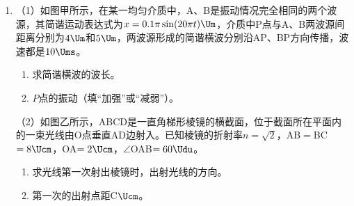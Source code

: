 \documentclass[\gkver]{gaokaozhenti}
\begin{document}
\begin{enumerate}
{根据理想气体状态方程得$\frac{p_{0}V_{0}}{T_{0}}=\frac{pV}{T}$②，

代入数据得$V=2.8\times10^{-2}\Umc$③。
}

\item
（1）如图甲所示，在某一均匀介质中，A、B是振动情况完全相同的两个波源，其简谐运动表达式为$x=0.1\pi\sin(20\pi t)\Um$，介质中P点与A、B两波源间距离分别为$4\Um$和$5\Um$，两波源形成的简谐横波分别沿AP、BP方向传播，波速都是$10\Ums$。
\begin{enumerate}
	\item
	求简谐横波的波长。
	\item
	$P$点的振动（填“加强”或“减弱”）。
\end{enumerate}


（2）如图乙所示，ABCD是一直角梯形棱镜的横截面，位于截面所在平面内的一束光线由O点垂直AD边射入。已知棱镜的折射率$n=\sqrt 2$，AB$=$BC$=8\Ucm$，OA$=2\Ucm$，$\angle$OAB$=60\Udu$。
\begin{enumerate}
	\item
	求光线第一次射出棱镜时，出射光线的方向。
	\item
	第一次的出射点距C$\Ucm$。
\end{enumerate}


\end{enumerate}
\end{document}
